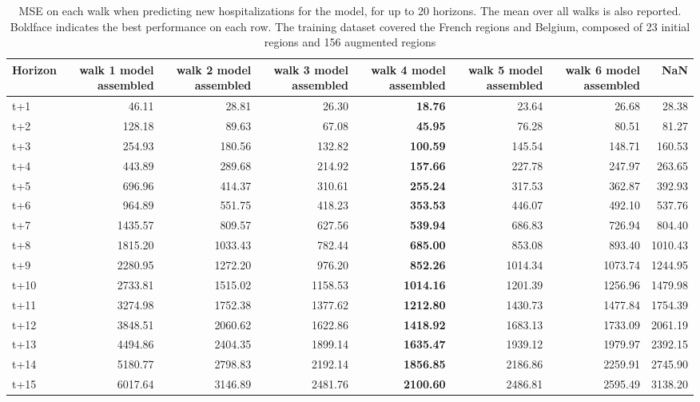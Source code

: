 \begin{table}[H]
\centering
\caption{MSE on each walk when predicting new hospitalizations for the model, for up to 20 horizons. The mean over all walks is also reported. Boldface indicates the best performance on each row. The training dataset covered the French regions and Belgium, composed of 23 initial regions and 156 augmented regions }
\label{tab:MSE_walk_assembly}
\begin{tabular}{lrrrrrrr}
\toprule
Horizon &  walk 1 model assembled &  walk 2 model assembled &  walk 3 model assembled &  walk 4 model assembled &  walk 5 model assembled &  walk 6 model assembled &     NaN \\
\midrule
t+1  & 46.11  & 28.81  & 26.30  & \textbf{18.76}  & 23.64  & 26.68  & 28.38  \\
t+2  & 128.18  & 89.63  & 67.08  & \textbf{45.95}  & 76.28  & 80.51  & 81.27  \\
t+3  & 254.93  & 180.56  & 132.82  & \textbf{100.59}  & 145.54  & 148.71  & 160.53  \\
t+4  & 443.89  & 289.68  & 214.92  & \textbf{157.66}  & 227.78  & 247.97  & 263.65  \\
t+5  & 696.96  & 414.37  & 310.61  & \textbf{255.24}  & 317.53  & 362.87  & 392.93  \\
t+6  & 964.89  & 551.75  & 418.23  & \textbf{353.53}  & 446.07  & 492.10  & 537.76  \\
t+7  & 1435.57  & 809.57  & 627.56  & \textbf{539.94}  & 686.83  & 726.94  & 804.40  \\
t+8  & 1815.20  & 1033.43  & 782.44  & \textbf{685.00}  & 853.08  & 893.40  & 1010.43  \\
t+9  & 2280.95  & 1272.20  & 976.20  & \textbf{852.26}  & 1014.34  & 1073.74  & 1244.95  \\
t+10  & 2733.81  & 1515.02  & 1158.53  & \textbf{1014.16}  & 1201.39  & 1256.96  & 1479.98  \\
t+11  & 3274.98  & 1752.38  & 1377.62  & \textbf{1212.80}  & 1430.73  & 1477.84  & 1754.39  \\
t+12  & 3848.51  & 2060.62  & 1622.86  & \textbf{1418.92}  & 1683.13  & 1733.09  & 2061.19  \\
t+13  & 4494.86  & 2404.35  & 1899.14  & \textbf{1635.47}  & 1939.12  & 1979.97  & 2392.15  \\
t+14  & 5180.77  & 2798.83  & 2192.14  & \textbf{1856.85}  & 2186.86  & 2259.91  & 2745.90  \\
t+15  & 6017.64  & 3146.89  & 2481.76  & \textbf{2100.60}  & 2486.81  & 2595.49  & 3138.20  \\

\end{tabular}
\end{table}
